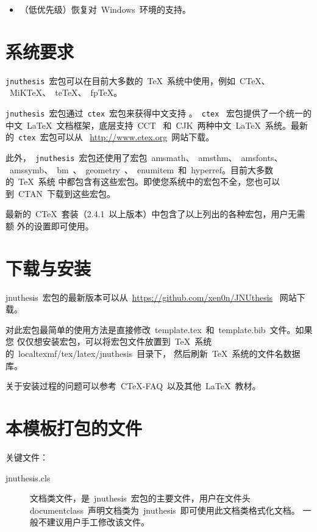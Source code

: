 \documentclass[pdftex, twoside, bachelor]{JNUthesis}
\begin{document}
\begin{spacing}{1.25}
\begin{itemize}
\item （低优先级）恢复对~Windows~环境的支持。

\end{itemize}

\section{系统要求}

\texttt{jnuthesis}~宏包可以在目前大多数的~\TeX{}~系统中使用，例如~C\TeX{}、
 ~MiK\TeX{}、~te\TeX{}、~fp\TeX{}。

\texttt{jnuthesis}~宏包通过~\texttt{ctex}~宏包来获得中文支持
。~\texttt{ctex}~ 宏包提供了一个统一的中文~\LaTeX{}~文档框架，底层支持~CCT~
和~CJK~两种中文~\LaTeX{}~系统。最新的~\texttt{ctex}~宏包可以从~
\url{http://www.ctex.org}~网站下载。

此外，~\texttt{jnuthesis}~宏包还使用了宏包~amsmath、~amsthm、~amsfonts、
 ~amssymb、~bm~、~geometry~、~enumitem~和~hyperref。目前大多数的~\TeX{}~系统
中都包含有这些宏包。即使您系统中的宏包不全，您也可以到~CTAN~下载到这些宏包。

最新的~C\TeX{}~套装（2.4.1~以上版本）中包含了以上列出的各种宏包，用户无需额
外的设置即可使用。

\section{下载与安装}

jnuthesis~宏包的最新版本可以从~\url{https://github.com/xen0n/JNUthesis}~
网站下载。

对此宏包最简单的使用方法是直接修改~template.tex~和~template.bib~文件。如果您
仅仅想安装宏包，可以将宏包文件放置到~\TeX{}~系统的~localtexmf/tex/latex/jnuthesis~目录下，
然后刷新~\TeX{}~系统的文件名数据库。

关于安装过程的问题可以参考~C\TeX{}-FAQ~以及其他~\LaTeX{}~教材。

\section{本模板打包的文件}

关键文件：

\begin{description}
\item[jnuthesis.cls] 文档类文件，是~jnuthesis~宏包的主要文件，用户在文件头
  ~\\documentclass~声明文档类为~jnuthesis~即可使用此文档类格式化文档。
  一般不建议用户手工修改该文件。


\end{description}
\end{spacing}
\end{document}
